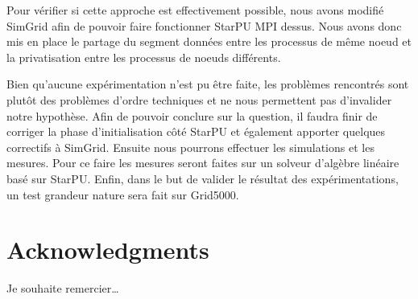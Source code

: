\documentclass[smallextended]{svjour3}
\begin{document}
Pour vérifier si cette approche est effectivement possible, nous
avons modifié SimGrid afin de pouvoir faire fonctionner StarPU MPI
dessus. Nous avons donc mis en place le partage du segment données
entre les processus de même noeud et la privatisation entre les
processus de noeuds différents. 

Bien qu'aucune expérimentation n'est pu être faite, les problèmes
rencontrés sont plutôt des problèmes d'ordre techniques et ne nous
permettent pas d'invalider notre hypothèse. Afin de pouvoir conclure
sur la question, il faudra finir de corriger la phase
d'initialisation côté StarPU et également apporter quelques
correctifs à SimGrid. Ensuite nous pourrons effectuer les
simulations et les mesures. Pour ce faire les mesures seront faites
sur un solveur d'algèbre linéaire basé sur StarPU. Enfin, dans le
but de valider le résultat des expérimentations, un test grandeur
nature sera fait sur Grid5000.  

\section*{Acknowledgments}
Je souhaite remercier\ldots{}

\nocite{*}
\def\raggedright{}


\end{document}
